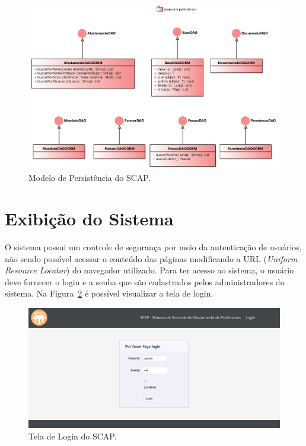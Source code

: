 \begin{figure}[!h]
	\centering
	\includegraphics[scale=0.45]{figuras/fig-projeto-persistencia} 
	\caption{Modelo de Persistência do SCAP.}
	\label{fig-projeto-persistencia}
\end{figure}

\section{Exibição do Sistema}
\label{sec-projeto-exibicao-sistema}

O sistema possui um controle de segurança por meio da autenticação de usuários, não sendo possível acessar o conteúdo das páginas modificando a URL (\textit{Uniform Resource Locator}) do navegador utilizado. Para ter acesso ao sistema, o usuário deve fornecer o login e a senha que são cadastrados pelos administradores do sistema. Na Figura~\ref{fig-projeto-login} é possível visualizar a tela de login.   

\begin{figure}[!h]
	\centering
	\includegraphics[scale=0.33]{figuras/fig-projeto-login} 
	\caption{Tela de Login do SCAP.}
	\label{fig-projeto-login}
\end{figure}

